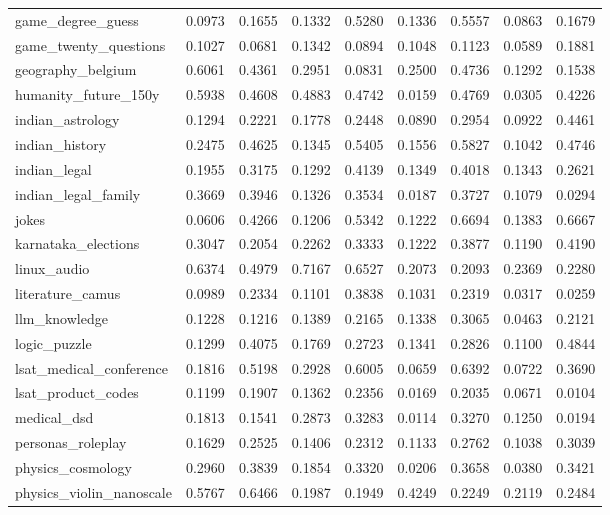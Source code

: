 \begin{landscape}
\begin{longtable}{@{}p{3.8cm}cccccccc@{}}
game\_degree\_guess & 0.0973 & 0.1655 & 0.1332 & 0.5280 & 0.1336 & 0.5557 & 0.0863 & 0.1679 \\
game\_twenty\_questions & 0.1027 & 0.0681 & 0.1342 & 0.0894 & 0.1048 & 0.1123 & 0.0589 & 0.1881 \\
geography\_belgium & 0.6061 & 0.4361 & 0.2951 & 0.0831 & 0.2500 & 0.4736 & 0.1292 & 0.1538 \\
humanity\_future\_150y & 0.5938 & 0.4608 & 0.4883 & 0.4742 & 0.0159 & 0.4769 & 0.0305 & 0.4226 \\
indian\_astrology & 0.1294 & 0.2221 & 0.1778 & 0.2448 & 0.0890 & 0.2954 & 0.0922 & 0.4461 \\
indian\_history & 0.2475 & 0.4625 & 0.1345 & 0.5405 & 0.1556 & 0.5827 & 0.1042 & 0.4746 \\
indian\_legal & 0.1955 & 0.3175 & 0.1292 & 0.4139 & 0.1349 & 0.4018 & 0.1343 & 0.2621 \\
indian\_legal\_family & 0.3669 & 0.3946 & 0.1326 & 0.3534 & 0.0187 & 0.3727 & 0.1079 & 0.0294 \\
jokes & 0.0606 & 0.4266 & 0.1206 & 0.5342 & 0.1222 & 0.6694 & 0.1383 & 0.6667 \\
karnataka\_elections & 0.3047 & 0.2054 & 0.2262 & 0.3333 & 0.1222 & 0.3877 & 0.1190 & 0.4190 \\
linux\_audio & 0.6374 & 0.4979 & 0.7167 & 0.6527 & 0.2073 & 0.2093 & 0.2369 & 0.2280 \\
literature\_camus & 0.0989 & 0.2334 & 0.1101 & 0.3838 & 0.1031 & 0.2319 & 0.0317 & 0.0259 \\
llm\_knowledge & 0.1228 & 0.1216 & 0.1389 & 0.2165 & 0.1338 & 0.3065 & 0.0463 & 0.2121 \\
logic\_puzzle & 0.1299 & 0.4075 & 0.1769 & 0.2723 & 0.1341 & 0.2826 & 0.1100 & 0.4844 \\
lsat\_medical\_conference & 0.1816 & 0.5198 & 0.2928 & 0.6005 & 0.0659 & 0.6392 & 0.0722 & 0.3690 \\
lsat\_product\_codes & 0.1199 & 0.1907 & 0.1362 & 0.2356 & 0.0169 & 0.2035 & 0.0671 & 0.0104 \\
medical\_dsd & 0.1813 & 0.1541 & 0.2873 & 0.3283 & 0.0114 & 0.3270 & 0.1250 & 0.0194 \\
personas\_roleplay & 0.1629 & 0.2525 & 0.1406 & 0.2312 & 0.1133 & 0.2762 & 0.1038 & 0.3039 \\
physics\_cosmology & 0.2960 & 0.3839 & 0.1854 & 0.3320 & 0.0206 & 0.3658 & 0.0380 & 0.3421 \\
physics\_violin\_nanoscale & 0.5767 & 0.6466 & 0.1987 & 0.1949 & 0.4249 & 0.2249 & 0.2119 & 0.2484 \\

\end{longtable}
\end{landscape}
